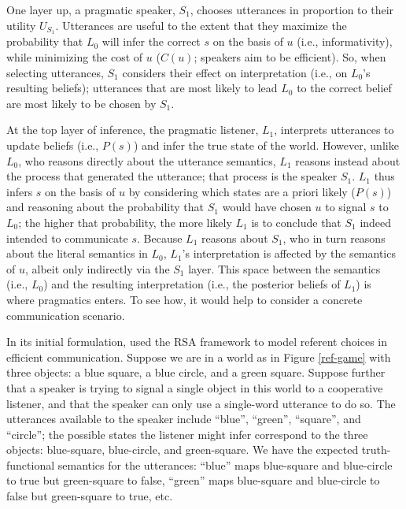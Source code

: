 \documentclass{sp}
\newcommand{\mht}[1]{\textcolor{purple}{[mht: #1]}}
\begin{document}
One layer up, a pragmatic speaker, $S_1$, chooses utterances in proportion to their utility $U_{S_{1}}$. Utterances are useful to the extent that they maximize the probability that $L_0$ will infer the correct $s$ on the basis of $u$ (i.e., informativity), while minimizing the cost of $u$ ($C(u)$; speakers aim to be efficient). So, when selecting utterances, $S_1$ considers their effect on interpretation (i.e., on $L_0$'s resulting beliefs); utterances that are most likely to lead $L_0$ to the correct belief are most likely to be chosen by $S_1$.

At the top layer of inference, the pragmatic listener, $L_1$, interprets utterances to update beliefs (i.e., $P(s)$) and infer the true state of the world. However, unlike $L_0$, who reasons directly about the utterance semantics, $L_1$ reasons instead about the process that generated the utterance; that process is the speaker $S_1$. $L_1$ thus infers $s$ on the basis of $u$ by considering which states are a priori likely ($P(s)$) and reasoning about the probability that $S_1$ would have chosen $u$ to signal $s$ to $L_0$; the higher that probability, the more likely $L_1$ is to conclude that $S_1$ indeed intended to communicate $s$. Because $L_1$ reasons about $S_1$, who in turn reasons about the literal semantics in $L_0$, $L_1$'s interpretation is affected by the semantics of $u$, albeit only indirectly via the $S_1$ layer. This space between the semantics (i.e., $L_0$) and the resulting interpretation (i.e., the posterior beliefs of $L_1$) is where pragmatics enters. 
To see how, it would help to consider a concrete communication scenario.

In its initial formulation, \cite{frankgoodman2012} used the RSA framework to model referent choices in efficient communication. Suppose we are in a world as in Figure \ref{ref-game} with three objects: a blue square, a blue circle, and a green square. Suppose further that a speaker is trying to signal a single object in this world to a cooperative listener, and that the speaker can only use a single-word utterance to do so. The utterances available to the speaker include ``blue'', ``green'', ``square'', and ``circle''; the possible states the listener might infer correspond to the three objects: blue-square, blue-circle, and green-square. We have the expected truth-functional semantics for the utterances: ``blue'' maps blue-square and blue-circle to true but green-square to false, ``green'' maps blue-square and blue-circle to false but green-square to true, etc.
\end{document}
